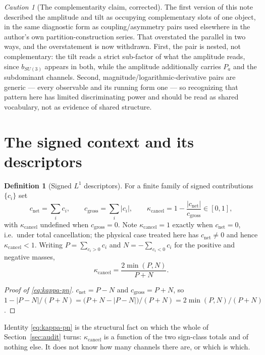 \documentclass[11pt]{article}
\theoremstyle{definition}
\newtheorem{definition}[theorem]{Definition}
\theoremstyle{remark}
\newtheorem{caution}[theorem]{Caution}
\newcommand{\net}{c_{\mathrm{net}}}
\newcommand{\gross}{c_{\mathrm{gross}}}
\newcommand{\kcancel}{\kappa_{\mathrm{cancel}}}
\begin{document}
\begin{caution}[The complementarity claim, corrected]
\label{caut:complementarity}
The first version of this note described the amplitude and tilt as occupying complementary slots
of one object, in the same diagnostic form as coupling/asymmetry pairs used elsewhere in the
author's own partition-construction series. That overstated the parallel in two ways, and the
overstatement is now withdrawn. First, the pair is nested, not complementary: the tilt reads a
strict sub-factor of what the amplitude reads, since $b_{SU(3)}$ appears in both, while the
amplitude additionally carries $P_a$ and the subdominant channels. Second, magnitude/logarithmic-derivative
pairs are generic --- every observable and its running form one --- so recognizing that pattern here
has limited discriminating power and should be read as shared vocabulary, not as evidence of shared
structure.
\end{caution}

\section{The signed context and its descriptors}
\label{sec:descriptors}

\begin{definition}[Signed $L^1$ descriptors]
\label{def:descriptors}
For a finite family of signed contributions $\{c_i\}$ set
\begin{equation}
\net = \sum_i c_i, \qquad \gross = \sum_i |c_i|, \qquad \kcancel = 1 - \frac{|\net|}{\gross} \in
[0,1],
\label{eq:descriptors}
\end{equation}
with $\kcancel$ undefined when $\gross = 0$. Note $\kcancel = 1$ exactly when $\net = 0$, i.e.\
under total cancellation; the physical case treated here has $\net \ne 0$ and hence $\kcancel < 1$.
Writing $P = \sum_{c_i>0} c_i$ and $N = -\sum_{c_i<0} c_i$ for the positive and negative masses,
\begin{equation}
\kcancel = \frac{2\min(P,N)}{P+N}.
\label{eq:kappa-pn}
\end{equation}
\end{definition}

\begin{proof}[Proof of \eqref{eq:kappa-pn}]
$\net = P-N$ and $\gross = P+N$, so $1 - |P-N|/(P+N) = \big(P+N-|P-N|\big)/(P+N) = 2\min(P,N)/(P+N)$.
\end{proof}

Identity \eqref{eq:kappa-pn} is the structural fact on which the whole of Section~\ref{sec:audit}
turns: $\kcancel$ is a function of the two sign-class totals and of nothing else. It does not know
how many channels there are, or which is which.
\end{document}
